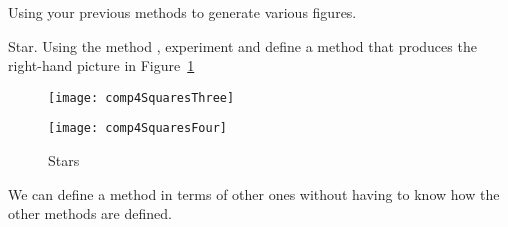 \begin{exonofig}
\newcommand{\replace}[2]{Modifying}{Using} your previous methods to generate various figures.
\end{exonofig}



\begin{exonofig}{Star.} 
Using the method , experiment and define a method  that \newcommand{\replace}[2]{produce}{produces} the \newcommand{\replace}[2]{right}{right-hand} picture in Figure~\ref{c7star}\newcommand{\add}[1]{.}
\end{exonofig}

\begin{figure}[!htbp]
\begin{minipage}[c]{.4\linewidth}
\centerline{\texttt{[image: comp4SquaresThree]}}
\end{minipage}
\hfill
\begin{minipage}[c]{.4\linewidth}
\centerline{\texttt{[image: comp4SquaresFour]}}
\end{minipage}
\label{c7star}
\caption{Stars}
\end{figure}


\summa

We can define a method in terms of other ones \newcommand{\remove}[1]{and this at various levels} without having to know how \newcommand{\replace}[2]{these}{the other} methods \newcommand{\remove}[1]{themselves} are defined.
\newcommand{\add}[1]{We can do this repeatedly and at more than one level.}

\ifx\wholebook\relax\else
\fi
